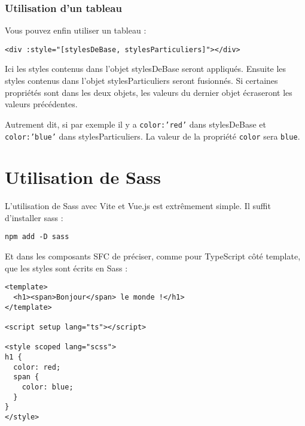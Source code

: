 \subsubsection{Utilisation d'un tableau}
Vous pouvez enfin utiliser un tableau :
\begin{verbatim}
<div :style="[stylesDeBase, stylesParticuliers]"></div>
\end{verbatim}
Ici les styles contenus dans l'objet {\color{monOrange}stylesDeBase} seront appliqués. Ensuite les styles contenus dans l'objet {\color{monOrange}stylesParticuliers} seront fusionnés. Si certaines propriétés sont dans les deux objets, les valeurs du dernier objet écraseront les valeurs précédentes.

Autrement dit, si par exemple il y a {\tt color:'red'} dans {\color{monOrange}stylesDeBase} et {\tt color:'blue'} dans {\color{monOrange}stylesParticuliers}. La valeur de la propriété {\tt color} sera {\tt blue}.


\section{Utilisation de {\color{monOrange}Sass}}
L'utilisation de {\color{monOrange}Sass} avec {\color{monOrange}Vite} et {\color{monOrange}Vue.js} est extrêmement simple. Il suffit d'installer {\color{monOrange}sass} :
\begin{verbatim}
npm add -D sass
\end{verbatim}
Et dans les composants {\color{monOrange}SFC} de préciser, comme pour {\color{monOrange}TypeScript} côté {\color{monOrange}template}, que les styles sont écrits en {\color{monOrange}Sass} :
\begin{verbatim}
<template>
  <h1><span>Bonjour</span> le monde !</h1>
</template>

<script setup lang="ts"></script>

<style scoped lang="scss">
h1 {
  color: red;
  span {
    color: blue;
  }
}
</style>
\end{verbatim}


